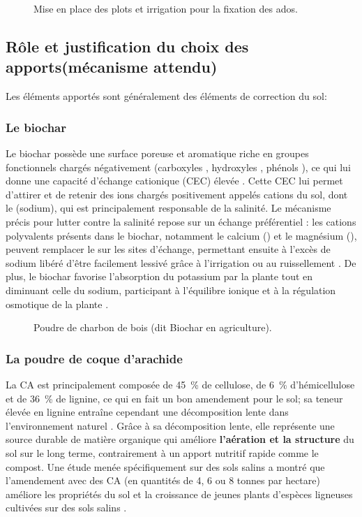 \begin{figure}[H]
    \centering
{}
    \caption{Mise en place des plots et irrigation pour la fixation des ados. }
    \label{fig:plotAdos2}
\end{figure}

\subsection{Rôle et justification du choix des apports(mécanisme attendu)}
Les éléments apportés sont généralement des éléments de correction du sol:
\subsubsection{Le biochar}
Le biochar possède une surface poreuse et aromatique riche en groupes fonctionnels chargés 
négativement (carboxyles , hydroxyles , phénols ), ce qui lui donne 
une capacité d'échange cationique (CEC) élevée \cite{chandrasekaran_comprehensive_2026}. Cette CEC lui permet d'attirer
et de retenir des ions chargés positivement appelés cations du sol, dont le  (sodium), qui est
principalement responsable de la salinité. Le mécanisme précis pour lutter contre la salinité 
repose sur un échange préférentiel : les cations polyvalents présents dans le biochar, notamment 
le calcium () et le magnésium (), peuvent remplacer le  sur les sites 
d'échange, permettant ensuite à l'excès de sodium libéré d'être facilement lessivé grâce à 
l'irrigation ou au ruissellement \cite{yuan_biochar_2023}. De plus, le biochar favorise l'absorption du potassium par la plante
tout en diminuant celle du sodium, participant à l'équilibre ionique et à la régulation osmotique de la plante \cite{chandrasekaran_comprehensive_2026,zubairu_overview_2025}.

    \begin{figure}[H]
    \centering
{}
    \caption{Poudre de charbon de bois (dit Biochar en agriculture). }
    \label{fig:biochar2}
\end{figure}

\subsubsection{La poudre de coque d’arachide}
La CA est principalement composée de 45~\% de cellulose, de 6~\% d’hémicellulose et de
36~\% de lignine, ce qui en fait un bon amendement pour le sol; sa teneur élevée en lignine
entraîne cependant une décomposition lente dans l’environnement naturel \cite{sawargaonkar_valorization_2024}. Grâce à sa
décomposition lente, elle représente une source durable de matière organique qui améliore
\textbf{l’aération et la structure} du sol sur le long terme, contrairement à un apport nutritif rapide
comme le compost. Une étude menée spécifiquement sur des sols salins a montré que
l’amendement avec des CA (en quantités de 4, 6 ou 8 tonnes par hectare) améliore les
propriétés du sol et la croissance de jeunes plants d’espèces ligneuses cultivées sur des
sols salins \cite{fall_effect_2018}. 

